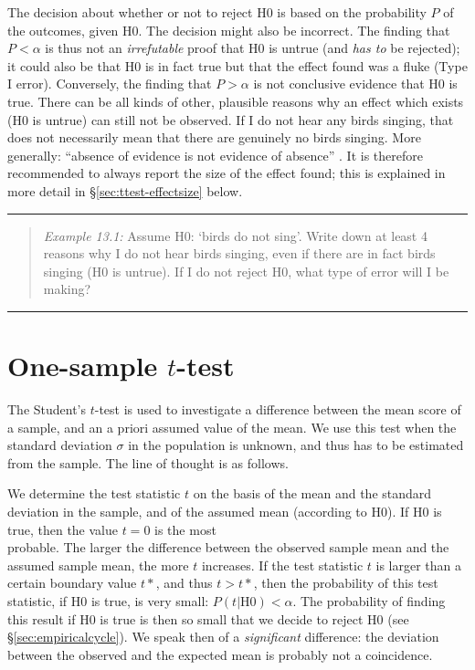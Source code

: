 \documentclass[
]{book}
\begin{document}
The decision about whether or not to reject H0 is based on the probability
\(P\) of the outcomes, given H0. The decision might also be
incorrect. The finding that \(P < \alpha\) is thus not an
\emph{irrefutable} proof that H0 is untrue (and \emph{has to} be
rejected); it could also be that H0 is in fact true but that the
effect found was a fluke (Type I error). Conversely, the finding
that \(P > \alpha\) is not conclusive evidence that H0 is true. There can
be all kinds of other, plausible reasons why an effect which exists (H0 is untrue)
can still not be observed. If I do not hear any birds singing, that does not necessarily
mean that there are genuinely no birds singing. More generally: ``absence of evidence is not
evidence of absence'' \citetext{\citealp[p.121]{Sagan96}; \citealp{Alde04}}. It is therefore recommended to always report the size of the effect found; this is explained in more detail in
§\ref{sec:ttest-effectsize} below.

\begin{center}\rule{0.5\linewidth}{0.5pt}\end{center}

\begin{quote}
\emph{Example 13.1:}
Assume H0: `birds do not sing'. Write
down at least 4 reasons why I do not hear birds singing, even
if there are in fact birds singing (H0 is untrue). If I do not reject H0,
what type of error will I be making?
\end{quote}

\begin{center}\rule{0.5\linewidth}{0.5pt}\end{center}

\hypertarget{sec:ttest-onesample}{%
\section{\texorpdfstring{One-sample \(t\)-test}{One-sample t-test}}\label{sec:ttest-onesample}}

The Student's \(t\)-test is used to investigate a difference
between the mean score of a sample, and an a priori assumed value
of the mean. We use this test when the standard deviation
\(\sigma\) in the population is unknown, and thus has to be estimated from
the sample. The line of thought is as follows.

We determine the test statistic \(t\) on the basis of the mean and the
standard deviation in the sample, and of the assumed mean (according to H0).
If H0 is true, then the value \(t=0\) is the most\\
probable. The larger the difference between the observed sample mean and the
assumed sample mean, the more \(t\) increases. If the test statistic \(t\) is larger than
a certain boundary value \(t*\), and thus \(t>t*\), then the probability of this test statistic,
if H0 is true, is very small: \(P(t|\textrm{H0}) < \alpha\). The probability of finding this result
if H0 is true is then so small that we decide to reject H0
(see §\ref{sec:empiricalcycle}). We speak then of a \emph{significant} difference:
the deviation between the observed and the expected mean is probably not a
coincidence.
\end{document}

